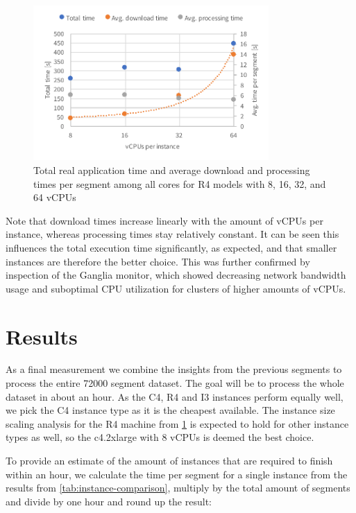 \documentclass{article}
\begin{document}
\begin{figure}[H]
	\centering
	\includegraphics[width=0.8\textwidth]{resource/r4-scaling.pdf}
	\caption{Total real application time and average download and processing times per segment among all cores for R4 models with 8, 16, 32, and 64 vCPUs}
	\label{fig:r4-scaling}
\end{figure}

Note that download times increase linearly with the amount of vCPUs per instance, whereas processing times stay relatively constant.
It can be seen this influences the total execution time significantly, as expected, and that smaller instances are therefore the better choice.
This was further confirmed by inspection of the Ganglia monitor, which showed decreasing network bandwidth usage and suboptimal CPU utilization for clusters of higher amounts of vCPUs.

\section{Results}
As a final measurement we combine the insights from the previous segments to process the entire \num{72000} segment dataset.
The goal will be to process the whole dataset in about an hour.
As the C4, R4 and I3 instances perform equally well, we pick the C4 instance type as it is the cheapest available.
The instance size scaling analysis for the R4 machine from \cref{fig:r4-scaling} is expected to hold for other instance types as well, so the c4.2xlarge with 8 vCPUs is deemed the best choice.

To provide an estimate of the amount of instances that are required to finish within an hour, we calculate the time per segment for a single instance from the results from \cref{tab:instance-comparison}, multiply by the total amount of segments and divide by one hour and round up the result:
\end{document}
